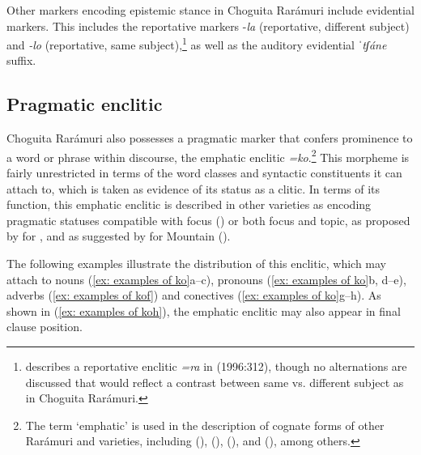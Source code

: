     \z
\z

Other markers encoding epistemic stance in Choguita Rarámuri include evidential markers. This includes the reportative markers {}-\textit{la} (reportative, different subject) and \textit{-lo} (reportative, same subject),\footnote{\citet{miller1996guarijio} describes a reportative enclitic \textit{=ra} in  (1996:312), though no alternations are discussed that would reflect a contrast between same vs. different subject as in Choguita Rarámuri.} as well as the auditory evidential \textit{ˈtʃáne} suffix.

\subsection{Pragmatic enclitic}
\label{subsec: empahtic clitics}

Choguita Rarámuri also possesses a pragmatic marker that confers prominence to a word or phrase within discourse, the emphatic enclitic \textit{=ko}.\footnote{The term `emphatic' is used in the description of cognate forms of other Rarámuri and  varieties, including  (\citealt{Burgess-1984}),  (\citealt{valdez2014predication}),  (\citealt{moralesmoreno2016rochecahi}), and  (\citealt{miller1996guarijio}), among others.} This morpheme is fairly unrestricted in terms of the word classes and syntactic constituents it can attach to, which is taken as evidence of its status as a clitic. In terms of its function, this emphatic enclitic is described in other varieties as encoding pragmatic statuses compatible with focus (\citealt{valdez2014predication}) or both focus and topic, as proposed by \citet{moralesmoreno2016rochecahi} for , and as suggested by \citet{miller1996guarijio} for Mountain  (\citeyear[313--315]{miller1996guarijio}).

The following examples illustrate the distribution of this enclitic, which may attach to nouns (\ref{ex: examples of ko}a--c), pronouns (\ref{ex: examples of ko}b, d--e), adverbs (\ref{ex: examples of kof}) and conectives (\ref{ex: examples of ko}g--h). As shown in (\ref{ex: examples of koh}), the emphatic enclitic may also appear in final clause position.

\ea\label{ex: examples of ko}

